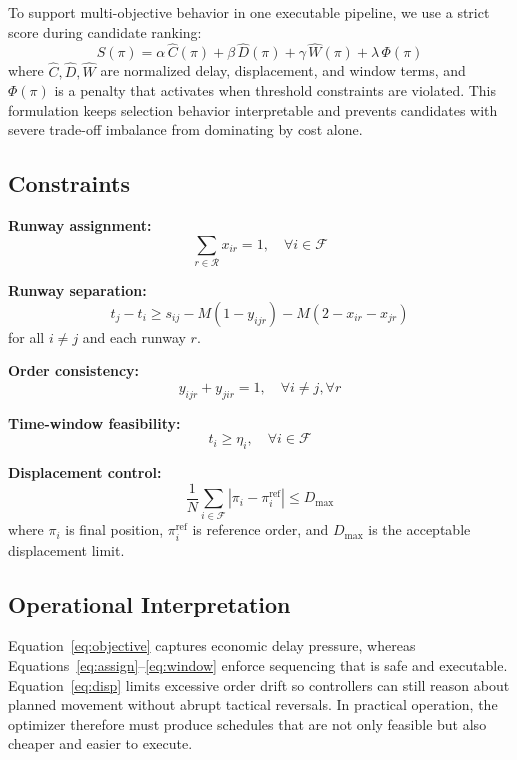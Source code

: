 \documentclass[conference]{IEEEtran}
\begin{document}
To support multi-objective behavior in one executable pipeline, we use a strict score during candidate ranking:
\begin{equation}
S(\pi)=\alpha\,\widehat{C}(\pi)+\beta\,\widehat{D}(\pi)+\gamma\,\widehat{W}(\pi)+\lambda\,\Phi(\pi)
\label{eq:strictscore}
\end{equation}
where $\widehat{C},\widehat{D},\widehat{W}$ are normalized delay, displacement, and window terms, and $\Phi(\pi)$ is a penalty that activates when threshold constraints are violated. This formulation keeps selection behavior interpretable and prevents candidates with severe trade-off imbalance from dominating by cost alone.

\subsection{Constraints}
\textbf{Runway assignment:}
\begin{equation}
\sum_{r\in\mathcal{R}} x_{ir}=1,\quad \forall i\in\mathcal{F}
\label{eq:assign}
\end{equation}

\textbf{Runway separation:}
\begin{equation}
t_j-t_i \ge s_{ij}-M(1-y_{ijr})-M(2-x_{ir}-x_{jr})
\label{eq:sep}
\end{equation}
for all $i\neq j$ and each runway $r$.

\textbf{Order consistency:}
\begin{equation}
y_{ijr}+y_{jir}=1,\quad \forall i\neq j,\forall r
\label{eq:order}
\end{equation}

\textbf{Time-window feasibility:}
\begin{equation}
t_i \ge \eta_i,\quad \forall i\in\mathcal{F}
\label{eq:window}
\end{equation}

\textbf{Displacement control:}
\begin{equation}
\frac{1}{N}\sum_{i\in\mathcal{F}}\left|\pi_i-\pi_i^{\text{ref}}\right| \le D_{\max}
\label{eq:disp}
\end{equation}
where $\pi_i$ is final position, $\pi_i^{\text{ref}}$ is reference order, and $D_{\max}$ is the acceptable displacement limit.

\subsection{Operational Interpretation}
Equation~\eqref{eq:objective} captures economic delay pressure, whereas Equations~\eqref{eq:assign}--\eqref{eq:window} enforce sequencing that is safe and executable. Equation~\eqref{eq:disp} limits excessive order drift so controllers can still reason about planned movement without abrupt tactical reversals. In practical operation, the optimizer therefore must produce schedules that are not only feasible but also cheaper and easier to execute.
\end{document}
